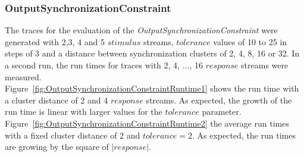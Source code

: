 \subsubsection{OutputSynchronizationConstraint}
The traces for the evaluation of the \textit{OutputSynchronizationConstraint} were generated with 2,3, 4 and 5 $stimulus$ streams, $tolerance$ values of 10 to 25 in steps of 3 and a distance between synchronization clusters of 2, 4, 8, 16 or 32. In a second run, the run times for traces with 2, 4, $\dots$, 16 $response$ streams were measured.\\
Figure~\ref{fig:OutputSynchronizationConstraintRuntime1} shows the run time with a cluster distance of 2 and 4 $response$ streams. As expected, the growth of the run time is linear with larger values for the $tolerance$ parameter. Figure~\ref{fig:OutputSynchronizationConstraintRuntime2}  the average run times with a fixed cluster distance of 2 and $tolerance=2$. As expected, the run times are growing by the square of $|response|$.
